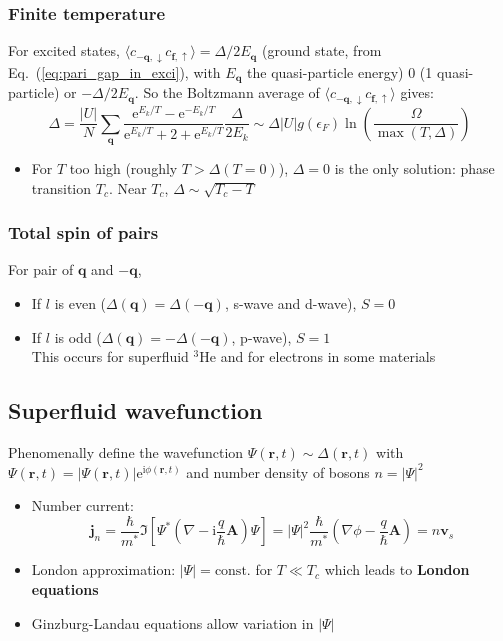 \documentclass[11pt,letterpaper]{article}
\numberwithin{equation}{section} %
\renewcommand*{\vec}[1]{\bm{#1}}
\newcommand\mi{\mathrm{i}}
\newcommand\e{\mathrm{e}}
\newcommand{\spind}{\ensuremath{\downarrow}}
\newcommand{\spinu}{\ensuremath{\uparrow}}
\begin{document}
\subsubsection{Finite temperature}
\label{ssub:Finite_temperature}
For excited states, $\langle c_{-\vec q,\spind} c_{\vec f,\spinu}\rangle =
\Delta/2E_{\vec q}$ (ground state, from Eq.~(\ref{eq:pari_gap_in_exci}), with
$E_{\vec q}$ the quasi-particle energy) $0$ (1 quasi-particle) or
$-\Delta/2E_{\vec q}$. So the Boltzmann average of $\langle c_{-\vec
q,\spind} c_{\vec f,\spinu}\rangle$ gives: 
\begin{equation}
	\Delta = \frac{|U|}{N}\sum_{\vec q}
	\frac{\e^{E_k/T}-\e^{-E_k/T}}{\e^{E_k/T}+2+\e^{E_k/T}}
	\frac{\Delta}{2E_k}
	\sim \Delta |U|g(\epsilon_F)\ln \left( \frac{\Omega}{\max (T,\Delta)} \right)
\end{equation}
\begin{itemize}
	\item For $T$ too high (roughly $T>\Delta(T=0)$), $\Delta=0$ is the only
		solution: phase transition $T_c$. Near $T_c$, $\Delta\sim\sqrt{T_c -
		T}$
\end{itemize}

\subsubsection{Total spin of pairs}
\label{ssub:Total_spin_of_pairs}
For pair of $\vec q$ and $-\vec q$, 
\begin{itemize}
	\item If $l$ is even ($\Delta(\vec q) = \Delta(-\vec q)$, s-wave and
		d-wave), $S=0$
	\item If $l$ is odd ($\Delta(\vec q) = -\Delta(-\vec q)$, p-wave),
		$S=1$\\
		This occurs for superfluid $^3$He and for electrons in some materials
\end{itemize}

\subsection{Superfluid wavefunction}
\label{sub:superfluid_wavefunction}
Phenomenally define the wavefunction $\Psi(\vec r, t) \sim \Delta(\vec r, t)$
with $\Psi(\vec r, t) = |\Psi(\vec r, t)|\e^{\mi\phi(\vec r, t)}$ and number
density of bosons $n = |\Psi|^2$
\begin{itemize}
  \item Number current: 
	  \begin{equation}\label{eq:sc_current}
		  \vec j_n = \frac{\hbar}{m^*}\Im \left[ \Psi^* \left( \nabla -
			  \mi\frac q\hbar \vec A \right) \Psi \right] 
			  = |\Psi|^2\frac\hbar{m^*} \left( \nabla\phi - \frac q\hbar \vec
				  A  \right) = n\vec v_s
	  \end{equation}
  \item London approximation: $|\Psi| = \mbox{const.}$ for $T\ll T_c$ which
	  leads to \textbf{London equations}
  \item Ginzburg-Landau equations allow variation in $|\Psi|$
\end{itemize}
\end{document}
